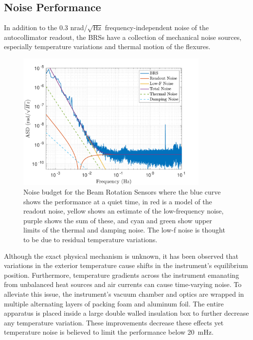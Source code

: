\documentclass [12pt, proquest]{uwthesis}[2019]
\begin{document}
\subsection{Noise Performance}\label{BRSNoise}

In addition to the 0.3 nrad/$\sqrt{\text{Hz}}$ frequency-independent noise of the autocollimator readout, the BRSs have a collection of mechanical noise sources, especially temperature variations and thermal motion of the flexures.

\begin{figure}
\begin{center}
\includegraphics[width=0.85\textwidth]{BRSNoiseModel.pdf}
\caption[Noise budge for the Beam Rotation Sensors]{Noise budget for the Beam Rotation Sensors where the blue curve shows the performance at a quiet time, in red is a model of the readout noise, yellow shows an estimate of the low-frequency noise, purple shows the sum of these, and cyan and green show upper limits of the thermal and damping noise. The low-f noise is thought to be due to residual temperature variations.}
\label{noise}
\end{center}
\end{figure}

Although the exact physical mechanism is unknown, it has been observed that variations in the exterior temperature cause shifts in the instrument's equilibrium position. Furthermore, temperature gradients across the instrument emanating from unbalanced heat sources and air currents can cause time-varying noise. To alleviate this issue, the instrument's vacuum chamber and optics are wrapped in multiple alternating layers of packing foam and aluminum foil. The entire apparatus is placed inside a large double walled insulation box to further decrease any temperature variation. These improvements decrease these effects yet temperature noise is believed to limit the performance below 20~mHz.
\end{document}
